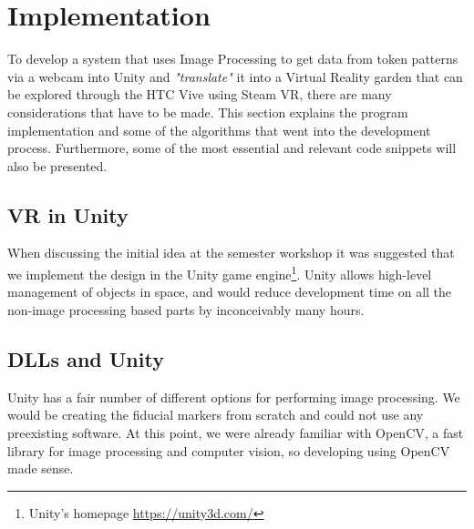 \chapter{Implementation}
	To develop a system that uses Image Processing to get data from token patterns via a webcam into Unity and \textit{"translate"} it into a Virtual Reality garden that can be explored through the HTC Vive using Steam VR, there are many considerations that have to be made. This section explains the program implementation and some of the algorithms that went into the development process. Furthermore, some of the most essential and relevant code snippets will also be presented.
	
	\section{VR in Unity}
	When discussing the initial idea at the semester workshop it was suggested that we implement the design in the Unity game engine\footnote{Unity's homepage \url{https://unity3d.com/}}. Unity allows high-level management of objects in space, and would reduce development time on all the non-image processing based parts by inconceivably many hours.
	
	\section{DLLs and Unity}
 		Unity has a fair number of different options for performing image processing. We would be creating the fiducial markers from scratch and could not use any preexisting software. At this point, we were already familiar with OpenCV, a fast library for image processing and computer vision, so developing using OpenCV made sense.\\
 		
